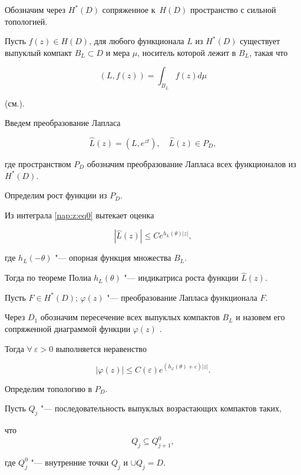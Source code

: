 

Обозначим через $H^*(D)$ сопряженное \linebreak к~$H(D)$ пространство с сильной топологией. 

Пусть $f(z)\in H(D)$, для любого функционала $L$ из $H^*(D)$ существует выпуклый компакт $B_L\subset D$ и мера $\mu$, носитель которой лежит в $B_L$, такая что 

\begin{equation}

\label{nap:z:eq0}

(L,f(z))=\int_{B_L} {f(z)d\mu}

\end{equation}

(см.\cite{zabirova00}). 

Введем преобразование Лапласа 

$$\hat L(z) =(L,e^{zt}),\quad \hat L(z) \in P_{D},$$ 

где пространством $P_D$ обозначим преобразование Лапласа всех функционалов из  $H^*(D)$. 

Определим рост функции из $P_D$. 

Из интеграла \eqref{nap:z:eq0} вытекает оценка 

$$|\hat L(z)|\leq Ce^{h_{L}(\theta)|z|},$$ 

где $h_L(-\theta)$ "--- опорная функция множества $B_L$. 

Тогда по теореме Полиа \cite[c.~51]{zabirova2_1} $h_{L}(\theta)$ "--- индикатриса роста функции $\hat L(z)$. 

Пусть $F\in H^*(D)$; $\varphi(z)$ "--- преобразование Лапласа функционала $F$. 

Через $D_1$ обозначим пересечение всех выпуклых компактов $B_L$ и назовем его сопряженной диаграммой функции $\varphi(z)$ \cite[c.~45]{zabirova2_1}. 

Тогда $\forall~ \varepsilon >0$ выполняется неравенство

$$|\varphi(z)|\leq C(\varepsilon) e^{(h_{\varphi}(\theta)+\varepsilon)|z|}.$$

 

Определим топологию в $P_D$.

Пусть $Q_j$ "--- последовательность выпуклых возрастающих компактов таких, 

что $$Q_j\subseteq Q_{j+1}^0,$$ 

где $Q_j^0$ "--- внутренние точки $Q_j$ и $\cup Q_j=D$. 

